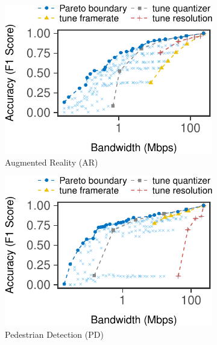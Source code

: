 \begin{figure}
  \centering
  \begin{subfigure}[t]{0.45\textwidth}
    \centering
    \includegraphics[width=\textwidth]{figures/profile-darknet.pdf}
    \caption{Augmented Reality (AR)}
    \label{fig:ar-profile}
  \end{subfigure}
  \hfill
  \begin{subfigure}[t]{0.45\textwidth}
    \centering
    \includegraphics[width=\textwidth]{figures/profile-mot.pdf}
    \caption{Pedestrian Detection (PD)}
    \label{fig:pd-profile}
  \end{subfigure}
  \\
  \vspace{1em}
  \begin{subfigure}[t]{0.45\textwidth}

\end{subfigure}
\end{figure}
